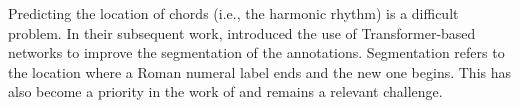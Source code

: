 

Predicting the location of chords (i.e., the harmonic
rhythm) is a difficult problem. In their subsequent work,
\textcite{chen2019harmony,chen2021attend} introduced the use
of Transformer-based networks
\parencite{vaswani2017attention} to improve the segmentation
of the annotations. Segmentation refers to the location
where a Roman numeral label ends and the new one begins.
This has also become a priority in the work of
\textcite{micchi2021deep} and remains a relevant challenge.
